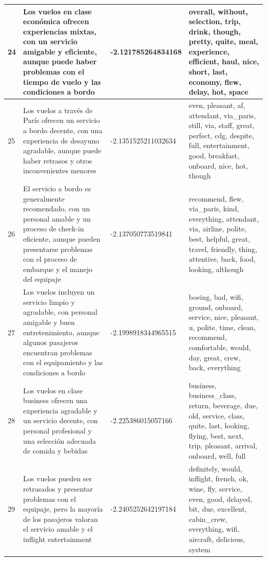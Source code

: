 \documentclass{report}
\begin{document}
{{\begin{longtable}{|p{1cm}|p{4cm}|p{4cm}|p{6cm}|}
                    \hline
                    24 & Los vuelos en clase económica ofrecen experiencias mixtas, con un servicio amigable y eficiente, aunque puede haber problemas con el tiempo de vuelo y las condiciones a bordo & -2.121785264834168 & overall, without, selection, trip, drink, though, pretty, quite, meal, experience, efficient, haul, nice, short, last, economy, flew, delay, hot, space \\
                    \hline
                    25 & Los vuelos a través de París ofrecen un servicio a bordo decente, con una experiencia de desayuno agradable, aunque puede haber retrasos y otros inconvenientes menores & -2.1351525211032634 & even, pleasant, af, attendant, via\_paris, still, via, staff, great, perfect, cdg, despite, full, entertainment, good, breakfast, onboard, nice, hot, though \\
                    \hline
                    26 & El servicio a bordo es generalmente recomendado, con un personal amable y un proceso de check-in eficiente, aunque pueden presentarse problemas con el proceso de embarque y el manejo del equipaje & -2.137050773519841 & recommend, flew, via\_paris, kind, everything, attendant, via, airline, polite, best, helpful, great, travel, friendly, thing, attentive, back, food, looking, although \\
                    \hline
                    27 & Los vuelos incluyen un servicio limpio y agradable, con personal amigable y buen entretenimiento, aunque algunos pasajeros encuentran problemas con el equipamiento y las condiciones a bordo & -2.1998918344965515 & boeing, bad, wifi, ground, onboard, service, nice, pleasant, u, polite, time, clean, recommend, comfortable, would, day, great, crew, back, everything \\
                    \hline
                    28 & Los vuelos en clase business ofrecen una experiencia agradable y un servicio decente, con personal profesional y una selección adecuada de comida y bebidas & -2.225386015057166 & business, business\_class, return, beverage, due, old, service, class, quite, last, looking, flying, best, next, trip, pleasant, arrival, onboard, well, full \\
                    \hline
                    29 & Los vuelos pueden ser retrasados y presentar problemas con el equipaje, pero la mayoría de los pasajeros valoran el servicio amable y el inflight entertainment & -2.2405252642197184 & definitely, would, inflight, french, ok, wine, fly, service, even, good, delayed, bit, due, excellent, cabin\_crew, everything, wifi, aircraft, delicious, system \\

\end{longtable}}}
\end{document}
